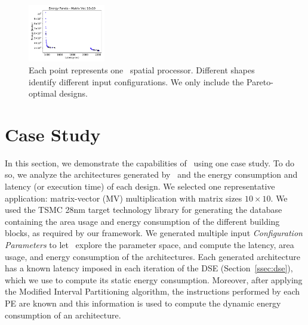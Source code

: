 \begin{figure}[ht]
\centering
  \includegraphics[width=0.3\textwidth]{graphs/EnergyParetoMatrixVec10_v3.pdf}
    \caption{\small Each point represents one \frameworkname~spatial processor. Different shapes identify different input configurations. We only include the Pareto-optimal designs.}
\label{fig:sram_vs_mram_pareto_vec}
\end{figure}
\section{Case Study}
\label{sec:case_studies}
In this section, we demonstrate the capabilities of \frameworkname~using one case study. To do so, we analyze the architectures generated by \frameworkname~and the energy consumption and latency (or execution time) of each design.
We selected one representative application: matrix-vector (MV) multiplication with matrix sizes $10\times10$. We used the TSMC 28nm target technology library for generating the database containing the area usage and energy consumption of the different building blocks, as required by our framework.
We generated multiple input \textit{Configuration Parameters} to let \frameworkname~explore the parameter space, and compute the latency, area usage, and energy consumption of the architectures. Each generated architecture has a known latency imposed in each iteration of the DSE (Section~\ref{ssec:dse}), which we use to compute its static energy consumption. Moreover, after applying the Modified Interval Partitioning algorithm, the instructions performed by each PE are known and this information is used to compute the dynamic energy consumption of an architecture.

